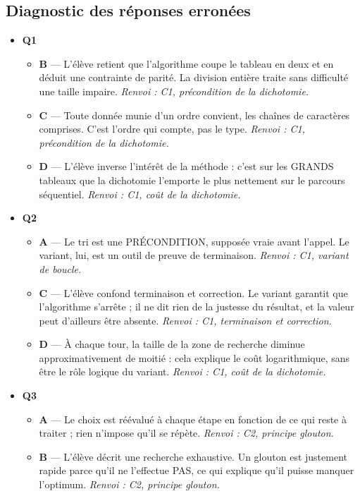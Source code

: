 \subsection*{Diagnostic des réponses erronées}

\begin{itemize}
  \item \textbf{Q1}
  \begin{itemize}
    \item \textbf{B} — L'élève retient que l'algorithme coupe le tableau en deux et en déduit une contrainte de parité. La division entière traite sans difficulté une taille impaire. \emph{Renvoi : C1, précondition de la dichotomie.}
    \item \textbf{C} — Toute donnée munie d'un ordre convient, les chaînes de caractères comprises. C'est l'ordre qui compte, pas le type. \emph{Renvoi : C1, précondition de la dichotomie.}
    \item \textbf{D} — L'élève inverse l'intérêt de la méthode : c'est sur les GRANDS tableaux que la dichotomie l'emporte le plus nettement sur le parcours séquentiel. \emph{Renvoi : C1, coût de la dichotomie.}
  \end{itemize}
  \item \textbf{Q2}
  \begin{itemize}
    \item \textbf{A} — Le tri est une PRÉCONDITION, supposée vraie avant l'appel. Le variant, lui, est un outil de preuve de terminaison. \emph{Renvoi : C1, variant de boucle.}
    \item \textbf{C} — L'élève confond terminaison et correction. Le variant garantit que l'algorithme s'arrête ; il ne dit rien de la justesse du résultat, et la valeur peut d'ailleurs être absente. \emph{Renvoi : C1, terminaison et correction.}
    \item \textbf{D} — À chaque tour, la taille de la zone de recherche diminue approximativement de moitié : cela explique le coût logarithmique, sans être le rôle logique du variant. \emph{Renvoi : C1, coût de la dichotomie.}
  \end{itemize}
  \item \textbf{Q3}
  \begin{itemize}
    \item \textbf{A} — Le choix est réévalué à chaque étape en fonction de ce qui reste à traiter ; rien n'impose qu'il se répète. \emph{Renvoi : C2, principe glouton.}
    \item \textbf{B} — L'élève décrit une recherche exhaustive. Un glouton est justement rapide parce qu'il ne l'effectue PAS, ce qui explique qu'il puisse manquer l'optimum. \emph{Renvoi : C2, principe glouton.}

\end{itemize}
\end{itemize}
